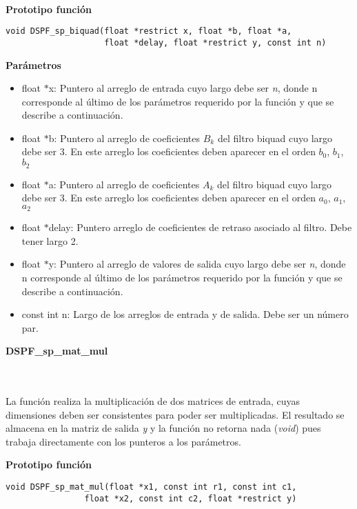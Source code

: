 \begin{enumerate}
\\
    
\textbf{Prototipo función}    

\begin{lstlisting}
void DSPF_sp_biquad(float *restrict x, float *b, float *a,
                    float *delay, float *restrict y, const int n)
\end{lstlisting}

\textbf{Parámetros}

\begin{itemize}
    \item float $*$x:  Puntero al arreglo de entrada  cuyo largo debe ser  \textit{n}, donde n corresponde al último de los parámetros requerido por la función y que se describe a continuación.
    \item float $*$b: Puntero al arreglo de coeficientes $B_k$ del filtro biquad cuyo largo debe ser  3. En este arreglo los coeficientes deben aparecer en el orden  {$b_0$, $b_1$, $b_2$}
    \item float $*$a:  Puntero al arreglo de coeficientes $A_k$ del filtro biquad cuyo largo debe ser  3. En este arreglo los coeficientes deben aparecer en el orden  {$a_0$, $a_1$, $a_2$}
    \item float $*$delay: Puntero arreglo de coeficientes de retraso asociado al filtro. Debe tener largo 2.
    \item float $*$y: Puntero al arreglo de valores de salida cuyo largo debe ser \textit{n},  donde n corresponde al último de los parámetros requerido por la función y que se describe a continuación.
    \item const int n: Largo de los arreglos de entrada y de salida. Debe ser un número par.
\end{itemize}


    
\textbf{DSPF\_sp\_mat\_mul}

\\ \\

La función realiza la multiplicación de dos matrices de entrada, cuyas dimensiones deben ser consistentes para poder ser multiplicadas. El resultado se almacena en la matriz de salida \textit{y} y la función no retorna nada (\textit{void}) pues trabaja directamente con los punteros a los parámetros.

\textbf{Prototipo función}    

\begin{lstlisting}
void DSPF_sp_mat_mul(float *x1, const int r1, const int c1, 
                float *x2, const int c2, float *restrict y)


\end{lstlisting}
\end{enumerate}
